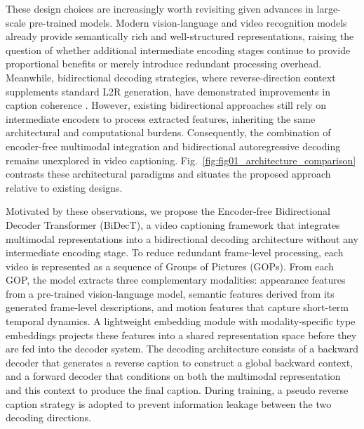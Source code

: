 These design choices are increasingly worth revisiting given advances in large-scale pre-trained models. Modern vision-language and video recognition models already provide semantically rich and well-structured representations, raising the question of whether additional intermediate encoding stages continue to provide proportional benefits or merely introduce redundant processing overhead. Meanwhile, bidirectional decoding strategies, where reverse-direction context supplements standard L2R generation, have demonstrated improvements in caption coherence \cite{zhongBiTransformerAugmentingSemantic2022, zhongBidirectionalTransformerKnowledge2024}. However, existing bidirectional approaches still rely on intermediate encoders to process extracted features, inheriting the same architectural and computational burdens. Consequently, the combination of encoder-free multimodal integration and bidirectional autoregressive decoding remains unexplored in video captioning. Fig.~\ref{fig:fig01_architecture_comparison} contrasts these architectural paradigms and situates the proposed approach relative to existing designs.

Motivated by these observations, we propose the Encoder-free Bidirectional Decoder Transformer (BiDecT), a video captioning framework that integrates multimodal representations into a bidirectional decoding architecture without any intermediate encoding stage. To reduce redundant frame-level processing, each video is represented as a sequence of Groups of Pictures (GOPs). From each GOP, the model extracts three complementary modalities: appearance features from a pre-trained vision-language model, semantic features derived from its generated frame-level descriptions, and motion features that capture short-term temporal dynamics. A lightweight embedding module with modality-specific type embeddings projects these features into a shared representation space before they are fed into the decoder system. The decoding architecture consists of a backward decoder that generates a reverse caption to construct a global backward context, and a forward decoder that conditions on both the multimodal representation and this context to produce the final caption. During training, a pseudo reverse caption strategy is adopted to prevent information leakage between the two decoding directions.


